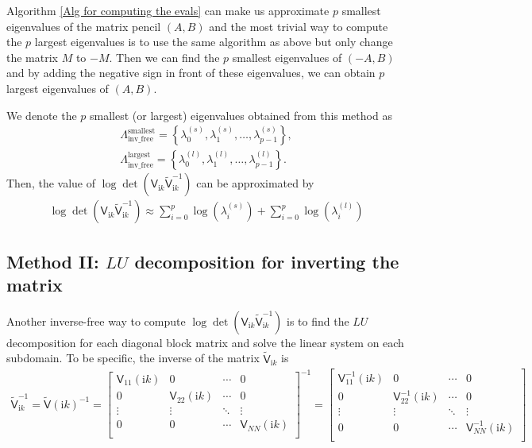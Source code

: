 Algorithm \ref{Alg for computing the evals} can make us approximate $p$ smallest eigenvalues of the matrix pencil $(A,B)$ and the most trivial way to compute 
the $p$ largest eigenvalues is to use the same algorithm as above but only change the matrix $M$ to $-M$. Then we can find the $p$ smallest eigenvalues of 
$(-A, B)$ and by adding the negative sign in front of these eigenvalues, we can obtain $p$ largest eigenvalues of $(A, B)$.

We denote the $p$ smallest (or largest) eigenvalues obtained from this method as 
\begin{align}
    \Lambda_{\text{inv\_free}}^{\text{smallest}} = \left\{\lambda_{0}^{(s)}, \lambda_{1}^{(s)}, \dots, \lambda_{p-1}^{(s)}\right\},\label{smallest Eigevalues in Krylov}\\
    \Lambda_{\text{inv\_free}}^{\text{largest}} = \left\{\lambda_{0}^{(l)}, \lambda_{1}^{(l)}, \dots, \lambda_{p-1}^{(l)}\right\}. \label{largest Eigevalues in Krylov}
\end{align}
Then, the value of  $\log\det(\mathsf{V}_{\mathrm{i}k}\tilde{\mathsf{V}}_{\mathrm{i}k}^{-1})$ can be approximated by 
\begin{align*}
    \log\det(\mathsf{V}_{\mathrm{i}k}\tilde{\mathsf{V}}_{\mathrm{i}k}^{-1}) \approx \sum_{i = 0}^{p} \log\left(\lambda_{i}^{(s)}\right) + \sum_{i = 0}^{p} \log\left(\lambda_{i}^{(l)}\right)
\end{align*}

\subsection{Method II: $LU$ decomposition for inverting the matrix}
Another inverse-free way to compute $\log\det(\mathsf{V}_{\mathrm{i}k}\tilde{\mathsf{V}}_{\mathrm{i}k}^{-1})$ is to find the $LU$ decomposition for 
each diagonal block matrix and solve the linear system on each subdomain. To be specific, the inverse of the matrix $\tilde{\mathsf{V}}_{\mathrm{i}k}$ is
\begin{align*}
    \tilde{\mathsf{V}}_{\mathrm{i}k}^{-1} =  \tilde{\mathsf{V}}(\mathrm{i}k)^{-1} = \begin{bmatrix}
        \mathsf{V}_{11}(\mathrm{i}k) & 0      & \cdots & 0 \\
    0      & \mathsf{V}_{22}(\mathrm{i}k) & \cdots & 0\\
    \vdots & \vdots & \ddots & \vdots \\
    0      & 0      & \cdots & \mathsf{V}_{NN}(\mathrm{i}k) \\
\end{bmatrix}^{-1}
= \begin{bmatrix}
    \mathsf{V}_{11}^{-1}(\mathrm{i}k) & 0      & \cdots & 0 \\
0      & \mathsf{V}_{22}^{-1}(\mathrm{i}k) & \cdots & 0\\
\vdots & \vdots & \ddots & \vdots \\
0      & 0      & \cdots & \mathsf{V}_{NN}^{-1} (\mathrm{i}k)\\
\end{bmatrix}
\end{align*}

